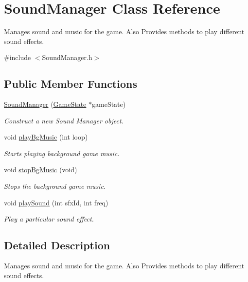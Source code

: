 \hypertarget{class_sound_manager}{}\section{Sound\+Manager Class Reference}
\label{class_sound_manager}


Manages sound and music for the game. Also Provides methods to play different sound effects.  




{\ttfamily \#include $<$Sound\+Manager.\+h$>$}

\subsection*{Public Member Functions}
\begin{DoxyCompactItemize}
\item 
\mbox{\hyperlink{class_sound_manager_a92850e5896fef1d8529fb26a057d1e15}{Sound\+Manager}} (\mbox{\hyperlink{struct_game_state}{Game\+State}} $\ast$game\+State)
\begin{DoxyCompactList}\small\item\em Construct a new Sound Manager object. \end{DoxyCompactList}\item 
void \mbox{\hyperlink{class_sound_manager_a80e41108d739852c94c563d3f96c7cd1}{play\+Bg\+Music}} (int loop)
\begin{DoxyCompactList}\small\item\em Starts playing background game music. \end{DoxyCompactList}\item 
void \mbox{\hyperlink{class_sound_manager_aaaf5f2a309aef452b8f3b749bce66698}{stop\+Bg\+Music}} (void)
\begin{DoxyCompactList}\small\item\em Stops the background game music. \end{DoxyCompactList}\item 
void \mbox{\hyperlink{class_sound_manager_a968f3c4811334fffe0f97809e7065722}{play\+Sound}} (int sfx\+Id, int freq)
\begin{DoxyCompactList}\small\item\em Play a particular sound effect. \end{DoxyCompactList}\end{DoxyCompactItemize}


\subsection{Detailed Description}
Manages sound and music for the game. Also Provides methods to play different sound effects. 



